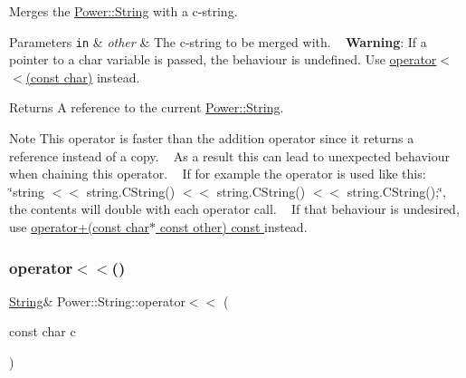 Merges the \hyperlink{class_power_1_1_string}{Power\+::\+String} with a c-\/string. 


\begin{DoxyParams}[1]{Parameters}
\mbox{\tt in}  & {\em other} & The c-\/string to be merged with. ~\newline
 {\bfseries Warning}\+: If a pointer to a char variable is passed, the behaviour is undefined. Use \hyperlink{class_power_1_1_string_af89ae1a7a705b6667290a08b911e3971}{operator$<$$<$(const char)} instead. \\
\hline
\end{DoxyParams}
\begin{DoxyReturn}{Returns}
A reference to the current \hyperlink{class_power_1_1_string}{Power\+::\+String}. 
\end{DoxyReturn}
\begin{DoxyNote}{Note}
This operator is faster than the addition operator since it returns a reference instead of a copy. ~\newline
 As a result this can lead to unexpected behaviour when chaining this operator. ~\newline
 If for example the operator is used like this\+: \char`\"{}string $<$$<$ string.\+C\+String() $<$$<$ string.\+C\+String() $<$$<$ string.\+C\+String();\char`\"{}, the contents will double with each operator call. ~\newline
 If that behaviour is undesired, use \hyperlink{class_power_1_1_string_af34ca6369790db392b8a39e2149e5201}{operator+(const char$\ast$ const other) const }instead. 
\end{DoxyNote}
\mbox{\label{class_power_1_1_string_af89ae1a7a705b6667290a08b911e3971}} 
\subsubsection{\texorpdfstring{operator$<$$<$()}{operator<<()}\hspace{0.1cm}{\footnotesize\ttfamily [3/3]}}
{\footnotesize\ttfamily \hyperlink{class_power_1_1_string}{String}\& Power\+::\+String\+::operator$<$$<$ (\begin{DoxyParamCaption}\item[{const char}]{c }\end{DoxyParamCaption})\hspace{0.3cm}{\ttfamily [inline]}}



